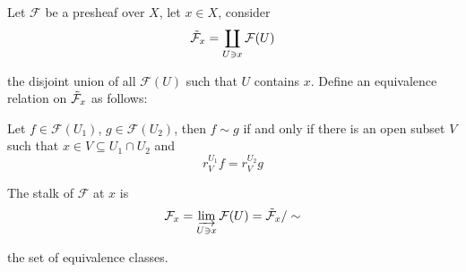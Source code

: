 \begin{definition}
	Let $\mathcal{F}$ be a presheaf over $X$, let $x \in X$, consider
	$$
		\Tilde{\mathcal{F}}_x = \coprod_{U \ni x} \mathcal{F}(U)
	$$
	
	the disjoint union of all $\mathcal{F}(U)$ such that $U$ contains $x$. Define an equivalence relation on $\Tilde{\mathcal{F}}_x$ as follows:
	
	Let $f \in \mathcal{F}(U_1)$, $g \in \mathcal{F}(U_2)$, then $f \sim g$ if and only if there is an open subset $V$ such that $x \in V \subseteq U_1 \cap U_2$ and
	$$
		r^{U_1}_V f = r^{U_2}_V g
	$$
	
	The stalk of $\mathcal{F}$ at $x$ is
	$$
		\mathcal{F}_x = \varinjlim_{U \ni x} \mathcal{F}(U) = \Tilde{\mathcal{F}}_x / \sim
	$$
	
	the set of equivalence classes.
\end{definition}

